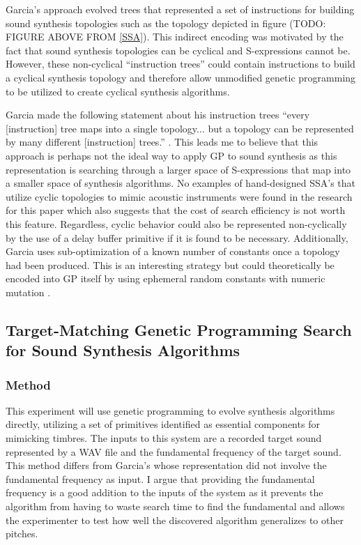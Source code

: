 \documentclass[12pt]{article}
\begin{document}
Garcia's approach evolved trees that represented a set of instructions for building sound synthesis topologies such as the topology depicted in figure (TODO: FIGURE ABOVE FROM \ref{SSA}). This indirect encoding was motivated by the fact that sound synthesis topologies can be cyclical and S-expressions cannot be. However, these non-cyclical ``instruction trees'' could contain instructions to build a cyclical synthesis topology and therefore allow unmodified genetic programming to be utilized to create cyclical synthesis algorithms.

Garcia made the following statement about his instruction trees ``every [instruction] tree maps into a single topology... but a topology can be represented by many different [instruction] trees.'' \citep{garcia2012automatic}. This leads me to believe that this approach is perhaps not the ideal way to apply GP to sound synthesis as this representation is searching through a larger space of S-expressions that map into a smaller space of synthesis algorithms. No examples of hand-designed SSA's that utilize cyclic topologies to mimic acoustic instruments were found in the research for this paper which also suggests that the cost of search efficiency is not worth this feature. Regardless, cyclic behavior could also be represented non-cyclically by the use of a delay buffer primitive if it is found to be necessary. Additionally, Garcia uses sub-optimization of a known number of constants once a topology had been produced. This is an interesting strategy but could theoretically be encoded into GP itself by using ephemeral random constants with numeric mutation \citep{evett1998numeric}.

\subsection{Target-Matching Genetic Programming Search for Sound Synthesis Algorithms}
\subsubsection{Method}
This experiment will use genetic programming to evolve synthesis algorithms directly, utilizing a set of primitives identified as essential components for mimicking timbres. The inputs to this system are a recorded target sound represented by a WAV file and the fundamental frequency of the target sound. This method differs from Garcia's whose representation did not involve the fundamental frequency as input. I argue that providing the fundamental frequency is a good addition to the inputs of the system as it prevents the algorithm from having to waste search time to find the fundamental and allows the experimenter to test how well the discovered algorithm generalizes to other pitches.
\end{document}
